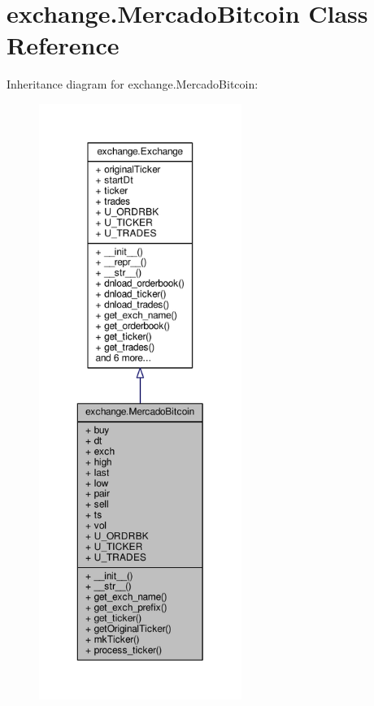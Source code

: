 \hypertarget{classexchange_1_1_mercado_bitcoin}{}\section{exchange.\+Mercado\+Bitcoin Class Reference}
\label{classexchange_1_1_mercado_bitcoin}


Inheritance diagram for exchange.\+Mercado\+Bitcoin\+:
\nopagebreak
\begin{figure}[H]
\begin{center}
\leavevmode
\includegraphics[height=550pt]{classexchange_1_1_mercado_bitcoin__inherit__graph}
\end{center}
\end{figure}


